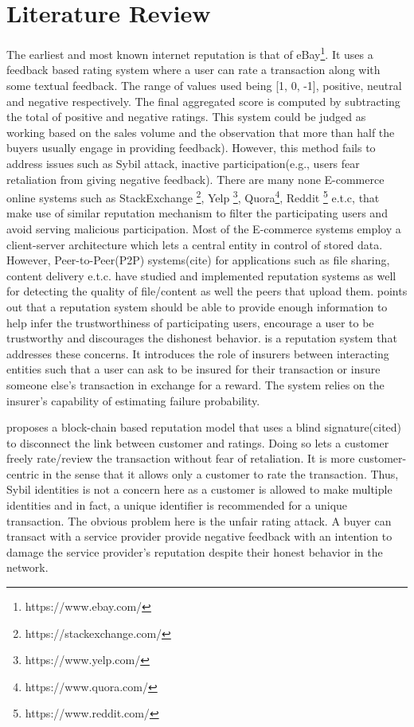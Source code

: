 \chapter{Literature Review} \label{ch:litrev}
The earliest and most known internet reputation is that of
eBay\footnote{https://www.ebay.com/}.  It uses a feedback based rating system
where a user can rate a transaction along with some textual feedback. The range
of values used being [1, 0, -1], positive, neutral and negative respectively.
The final aggregated score is computed by subtracting the total of positive and
negative ratings. This system \cite{resnick2002trust} \cite{resnick2006value}
could be judged as working based on the sales volume and the observation that
more than half the buyers usually engage in providing feedback). However, this
method fails to address issues such as Sybil attack, inactive
participation(e.g., users fear retaliation from giving negative feedback).
There are many none E-commerce online systems such as StackExchange
\footnote{https://stackexchange.com/}, Yelp \footnote{https://www.yelp.com/},
Quora\footnote{https://www.quora.com/}, Reddit
\footnote{https://www.reddit.com/} e.t.c, that make use of similar reputation
mechanism to filter the participating users and avoid serving malicious
participation. Most of the E-commerce systems employ a client-server
architecture which lets a central entity in control of stored data. However,
Peer-to-Peer(P2P) systems(cite) for applications such as file sharing, content
delivery e.t.c. have studied and implemented reputation systems as well for
detecting the quality of file/content as well the peers that upload them.
\cite{resnick2000reputation}points out that a reputation system should be able
to provide enough information to help infer the trustworthiness of
participating users, encourage a user to be trustworthy and discourages the
dishonest behavior.\cite{defigueiredo2005trustdavis} is a reputation system
that addresses these concerns. It introduces the role of insurers between
interacting entities such that a user can ask to be insured for their
transaction or insure someone else's transaction in exchange for a reward. The
system relies on the insurer's capability of estimating failure probability. 

\cite{schaub2016trustless} proposes a block-chain based reputation model that
uses a blind signature(cited) to disconnect the link between customer and
ratings. Doing so lets a customer freely rate/review the transaction without
fear of retaliation. It is more customer-centric in the sense that it allows
only a customer to rate the transaction. Thus, Sybil identities is not a
concern here as a customer is allowed to make multiple identities and in fact,
a unique identifier is recommended for a unique transaction. The obvious
problem here is the unfair rating attack. A buyer can transact with a service
provider provide negative feedback with an intention to damage the service
provider's reputation despite their honest behavior in the network. 



